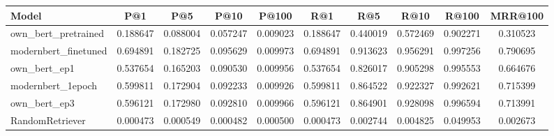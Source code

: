 \begin{tabular}{lccccccccc}
\toprule
Model & P@1 & P@5 & P@10 & P@100 & R@1 & R@5 & R@10 & R@100 & MRR@100 \\
\midrule
own\_bert\_pretrained & 0.188647 & 0.088004 & 0.057247 & 0.009023 & 0.188647 & 0.440019 & 0.572469 & 0.902271 & 0.310523 \\
modernbert\_finetuned & 0.694891 & 0.182725 & 0.095629 & 0.009973 & 0.694891 & 0.913623 & 0.956291 & 0.997256 & 0.790695 \\
own\_bert\_ep1 & 0.537654 & 0.165203 & 0.090530 & 0.009956 & 0.537654 & 0.826017 & 0.905298 & 0.995553 & 0.664676 \\
modernbert\_1epoch & 0.599811 & 0.172904 & 0.092233 & 0.009926 & 0.599811 & 0.864522 & 0.922327 & 0.992621 & 0.715399 \\
own\_bert\_ep3 & 0.596121 & 0.172980 & 0.092810 & 0.009966 & 0.596121 & 0.864901 & 0.928098 & 0.996594 & 0.713991 \\
RandomRetriever & 0.000473 & 0.000549 & 0.000482 & 0.000500 & 0.000473 & 0.002744 & 0.004825 & 0.049953 & 0.002673 \\
\bottomrule
\end{tabular}
